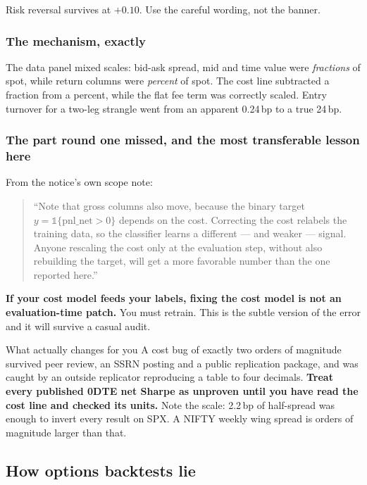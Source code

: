 \documentclass[11pt,a4paper]{article}
\begin{document}
Risk reversal survives at $+0.10$. Use the careful wording, not the banner.

\subsubsection{The mechanism, exactly}

The data panel mixed scales: bid-ask spread, mid and time value were \emph{fractions}
of spot, while return columns were \emph{percent} of spot. The cost line subtracted
a fraction from a percent, while the flat fee term was correctly scaled. Entry
turnover for a two-leg strangle went from an apparent 0.24\,bp to a true 24\,bp.

\subsubsection{The part round one missed, and the most transferable lesson here}

From the notice's own scope note:

\begin{quote}\small
``Note that gross columns also move, because the binary target
$y = \mathbb{1}\{\text{pnl\_net} > 0\}$ depends on the cost. Correcting the cost
relabels the training data, so the classifier learns a different --- and weaker
--- signal. Anyone rescaling the cost only at the evaluation step, without also
rebuilding the target, will get a more favorable number than the one reported here.''
\end{quote}

\textbf{If your cost model feeds your labels, fixing the cost model is not an
evaluation-time patch.} You must retrain. This is the subtle version of the error
and it will survive a casual audit.

\begin{keyfact}{What actually changes for you}
A cost bug of exactly two orders of magnitude survived peer review, an SSRN
posting and a public replication package, and was caught by an outside replicator
reproducing a table to four decimals. \textbf{Treat every published 0DTE net
Sharpe as unproven until you have read the cost line and checked its units.} Note
the scale: 2.2\,bp of half-spread was enough to invert every result on SPX. A
NIFTY weekly wing spread is orders of magnitude larger than that.
\end{keyfact}

\subsection{How options backtests lie}
\end{document}
